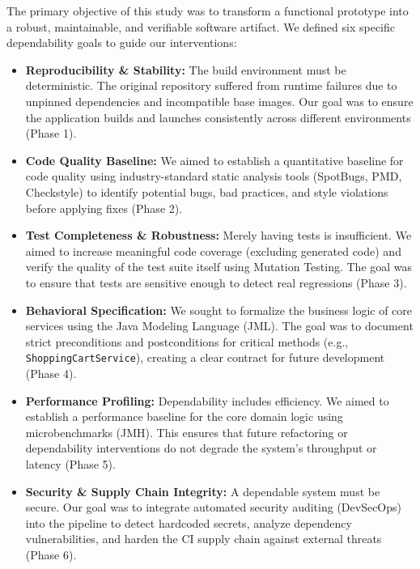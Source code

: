 The primary objective of this study was to transform a functional prototype into a robust, maintainable, and verifiable software artifact. We defined six specific dependability goals to guide our interventions:

\begin{itemize}
    \item \textbf{Reproducibility \& Stability:} The build environment must be deterministic. The original repository suffered from runtime failures due to unpinned dependencies and incompatible base images. Our goal was to ensure the application builds and launches consistently across different environments (Phase 1).
    \item \textbf{Code Quality Baseline:} We aimed to establish a quantitative baseline for code quality using industry-standard static analysis tools (SpotBugs, PMD, Checkstyle) to identify potential bugs, bad practices, and style violations before applying fixes (Phase 2).
    \item \textbf{Test Completeness \& Robustness:} Merely having tests is insufficient. We aimed to increase meaningful code coverage (excluding generated code) and verify the quality of the test suite itself using Mutation Testing. The goal was to ensure that tests are sensitive enough to detect real regressions (Phase 3).
    \item \textbf{Behavioral Specification:} We sought to formalize the business logic of core services using the Java Modeling Language (JML). The goal was to document strict preconditions and postconditions for critical methods (e.g., \texttt{ShoppingCartService}), creating a clear contract for future development (Phase 4).
    \item \textbf{Performance Profiling:} Dependability includes efficiency. We aimed to establish a performance baseline for the core domain logic using microbenchmarks (JMH). This ensures that future refactoring or dependability interventions do not degrade the system's throughput or latency (Phase 5).
    \item \textbf{Security \& Supply Chain Integrity:} A dependable system must be secure. Our goal was to integrate automated security auditing (DevSecOps) into the pipeline to detect hardcoded secrets, analyze dependency vulnerabilities, and harden the CI supply chain against external threats (Phase 6).
\end{itemize}